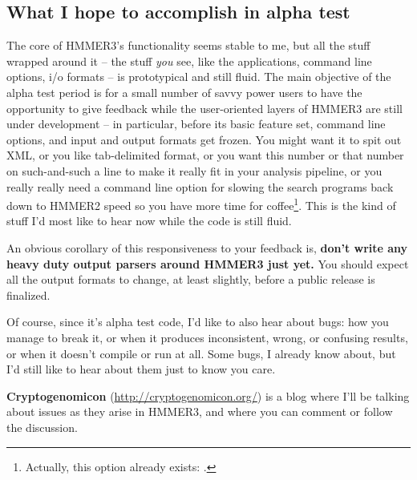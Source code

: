 \subsection{What I hope to accomplish in alpha test}

The core of HMMER3's functionality seems stable to me, but all the
stuff wrapped around it -- the stuff \emph{you} see, like the
applications, command line options, i/o formats -- is prototypical and
still fluid.  The main objective of the alpha test period is for a
small number of savvy power users to have the opportunity to give
feedback while the user-oriented layers of HMMER3 are still under
development -- in particular, before its basic feature set, command
line options, and input and output formats get frozen. You might want
it to spit out XML, or you like tab-delimited format, or you want this
number or that number on such-and-such a line to make it really fit in
your analysis pipeline, or you really really need a command line
option for slowing the search programs back down to HMMER2 speed so
you have more time for coffee\footnote{Actually, this option already
exists: .}. This is the kind of stuff I'd most like to
hear now while the code is still fluid.

\begin{sidebar}
An obvious corollary of this responsiveness to your feedback is,
\textbf{don't write any heavy duty output parsers around HMMER3 just
yet.} You should expect all the output formats to change, at least
slightly, before a public release is finalized.
\end{sidebar}

Of course, since it's alpha test code, I'd like to also hear about
bugs: how you manage to break it, or when it produces inconsistent,
wrong, or confusing results, or when it doesn't compile or run at all.
Some bugs, I already know about, but I'd still like to hear about them
just to know you care.

\textbf{Cryptogenomicon} (\url{http://cryptogenomicon.org/}) is a blog
where I'll be talking about issues as they arise in HMMER3, and where
you can comment or follow the discussion.





















  









